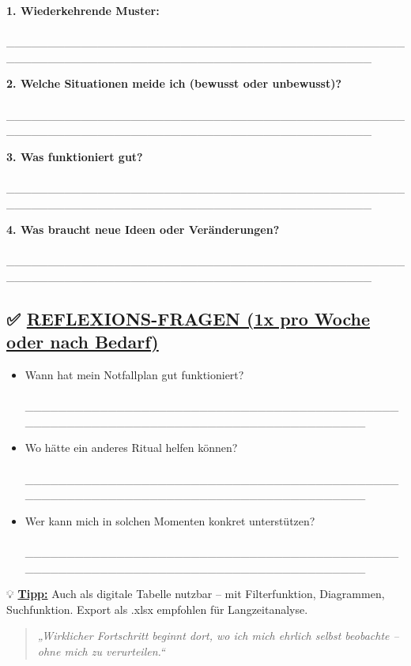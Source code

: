 \textbf{1. Wiederkehrende Muster:}\\
📝 \_\_\_\_\_\_\_\_\_\_\_\_\_\_\_\_\_\_\_\_\_\_\_\_\_\_\_\_\_\_\_\_\_\_\_\_\_\_\_\_\_\_\_\_\_\_\_\_\_\_\_\_\_\_\_\_\_\_\_\_\_\_\_\_\_\_\_\_\_\_\_\_\_\_\_\_\_\_\_\_\_\_\_\_\_\_\_\_\_\_\_\_

\textbf{2. Welche Situationen meide ich (bewusst oder unbewusst)?}\\
📝 \_\_\_\_\_\_\_\_\_\_\_\_\_\_\_\_\_\_\_\_\_\_\_\_\_\_\_\_\_\_\_\_\_\_\_\_\_\_\_\_\_\_\_\_\_\_\_\_\_\_\_\_\_\_\_\_\_\_\_\_\_\_\_\_\_\_\_\_\_\_\_\_\_\_\_\_\_\_\_\_\_\_\_\_\_\_\_\_\_\_\_\_

\textbf{3. Was funktioniert gut?}\\
📝 \_\_\_\_\_\_\_\_\_\_\_\_\_\_\_\_\_\_\_\_\_\_\_\_\_\_\_\_\_\_\_\_\_\_\_\_\_\_\_\_\_\_\_\_\_\_\_\_\_\_\_\_\_\_\_\_\_\_\_\_\_\_\_\_\_\_\_\_\_\_\_\_\_\_\_\_\_\_\_\_\_\_\_\_\_\_\_\_\_\_\_\_

\textbf{4. Was braucht neue Ideen oder Veränderungen?}\\
📝 \_\_\_\_\_\_\_\_\_\_\_\_\_\_\_\_\_\_\_\_\_\_\_\_\_\_\_\_\_\_\_\_\_\_\_\_\_\_\_\_\_\_\_\_\_\_\_\_\_\_\_\_\_\_\_\_\_\_\_\_\_\_\_\_\_\_\_\_\_\_\_\_\_\_\_\_\_\_\_\_\_\_\_\_\_\_\_\_\_\_\_\_

\hypertarget{reflexions-fragen-1x-pro-woche-oder-nach-bedarf}{%
\subsection{\texorpdfstring{✅ \textbf{\ul{REFLEXIONS-FRAGEN (1x pro Woche oder nach Bedarf)}}}{✅ REFLEXIONS-FRAGEN (1x pro Woche oder nach Bedarf)}}\label{reflexions-fragen-1x-pro-woche-oder-nach-bedarf}}

\begin{itemize}
\item
  Wann hat mein Notfallplan gut funktioniert?\\
  📝 \_\_\_\_\_\_\_\_\_\_\_\_\_\_\_\_\_\_\_\_\_\_\_\_\_\_\_\_\_\_\_\_\_\_\_\_\_\_\_\_\_\_\_\_\_\_\_\_\_\_\_\_\_\_\_\_\_\_\_\_\_\_\_\_\_\_\_\_\_\_\_\_\_\_\_\_\_\_\_\_\_\_\_\_\_\_
\item
  Wo hätte ein anderes Ritual helfen können?\\
  📝 \_\_\_\_\_\_\_\_\_\_\_\_\_\_\_\_\_\_\_\_\_\_\_\_\_\_\_\_\_\_\_\_\_\_\_\_\_\_\_\_\_\_\_\_\_\_\_\_\_\_\_\_\_\_\_\_\_\_\_\_\_\_\_\_\_\_\_\_\_\_\_\_\_\_\_\_\_\_\_\_\_\_\_\_\_\_
\item
  Wer kann mich in solchen Momenten konkret unterstützen?\\
  📝 \_\_\_\_\_\_\_\_\_\_\_\_\_\_\_\_\_\_\_\_\_\_\_\_\_\_\_\_\_\_\_\_\_\_\_\_\_\_\_\_\_\_\_\_\_\_\_\_\_\_\_\_\_\_\_\_\_\_\_\_\_\_\_\_\_\_\_\_\_\_\_\_\_\_\_\_\_\_\_\_\_\_\_\_\_\_
\end{itemize}

💡 \textbf{\ul{Tipp:}} Auch als digitale Tabelle nutzbar -- mit Filterfunktion, Diagrammen, Suchfunktion. Export als .xlsx empfohlen für Langzeitanalyse.

\begin{quote}
\emph{„Wirklicher Fortschritt beginnt dort, wo ich mich ehrlich selbst beobachte -- ohne mich zu verurteilen.``}
\end{quote}


